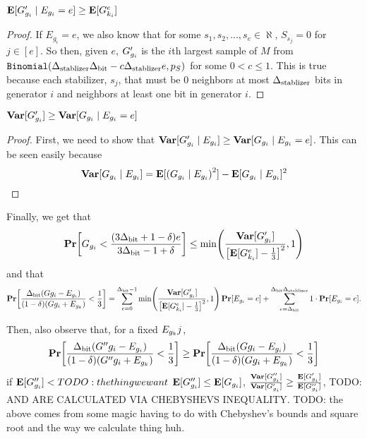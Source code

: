 \begin{lemma}{$\operatorname*{\mathbf{E}}[G'_{g_i} \mid E_{g_i} = e] \geq \operatorname*{\mathbf{E}}[G^e_{k_i}]$}
\begin{proof}
	If $E_{g_i} = e$, we also know that for some $s_1, s_2, ..., s_e \in \aleph$, $S_{s_j} = 0$ for $j \in [e]$.
	So then, given $e$, $G'_{g_i}$ is the $i$th largest sample of $M$ from $\texttt{Binomial}({\Delta_{\text{stablizer}}} {\Delta_{\text{bit}}} - c{\Delta_{\text{stablizer}}} e, p_S)$
	for some $0 < c \leq 1$.
	This is true because each stabilizer, $s_j$, that must be 0 neighbors at most ${\Delta_{\text{stablizer}}}$ bits
	in generator $i$ and neighbors at least one bit in generator $i$.
\end{proof}	
\end{lemma}

\begin{lemma}{$\operatorname*{\mathbf{Var}}[G'_{g_i}] \geq \operatorname*{\mathbf{Var}}[G_{g_i} \mid E_{g_i} = e]$}
\begin{proof}
	First, we need to show that 
	$\operatorname*{\mathbf{Var}}[G'_{g_i} \mid E_{g_i}] \geq \operatorname*{\mathbf{Var}}[G_{g_i} \mid E_{g_i} = e]$.
	This can be seen easily because 
	$$
		\Var[\genscoreRVCorrected_{g_i} \mid \lyingGenerator_{g_i}] =
			\E[\mleft(\genscoreRVCorrected_{g_i} \mid \lyingGenerator_{g_i}\mright)^2] - \E[\genscoreRVCorrected_{g_i} \mid \lyingGenerator_{g_i}]^2
	$$
\end{proof}	
\end{lemma}

\newcommand{\chebyshevFinalBound}{
	\min\mleft(\frac{\Var[\generatorscoreRV_{g_i}]}
		{\mleft[\E[\generatorscoreRVGivenE_{k_i}] - \frac{1}{3}\mright]^2}, 1\mright)
}
Finally, we get that 
\begin{align*}
	\Pr\mleft[\genscoreRVCorrected_{g_i} < \desiredGPrimeUpperBound \mright] \leq \chebyshevFinalBound
\end{align*}
and that
$$
	\Pr\mleft[\OptVarEq < \frac{1}{3}\mright] = 
	\sum_{e = 0}^{\DegBit - 1} 
		\chebyshevFinalBound \Pr\mleft[E_{g_i} = e\mright]
	+ \sum_{e = \DegBit}^{\DegBit \DegStable} 1 \cdot \Pr\mleft[\lyingGenerator_{g_i} = e\mright].
$$


\newpage

Then, also observe that, for a fixed $E_{g_k}j$, 
$$
	\Pr\mleft[\OptVarEqChangeable{G''} < \frac{1}{3}\mright] \geq \Pr\mleft[\OptVarEq < \frac{1}{3}\mright]
$$
if $\operatorname*{\mathbf{E}}[G''_{g_i}] < TODO: the thing we want$ $\operatorname*{\mathbf{E}}[G''_{g_i}] \leq \operatorname*{\mathbf{E}}[G_{g_i}]$, 
$\frac{\operatorname*{\mathbf{Var}}[G''_{g_i}]}{\operatorname*{\mathbf{Var}}[G'_{g_i}]} \geq \frac{\operatorname*{\mathbf{E}}[G'_{g_i}]}{\operatorname*{\mathbf{E}}[G''_{g_i}]}$,
TODO: AND ARE CALCULATED VIA CHEBYSHEVS INEQUALITY.
TODO: the above comes from some magic having to do with Chebyshev's bounds and square root
and the way we calculate thing huh. 

